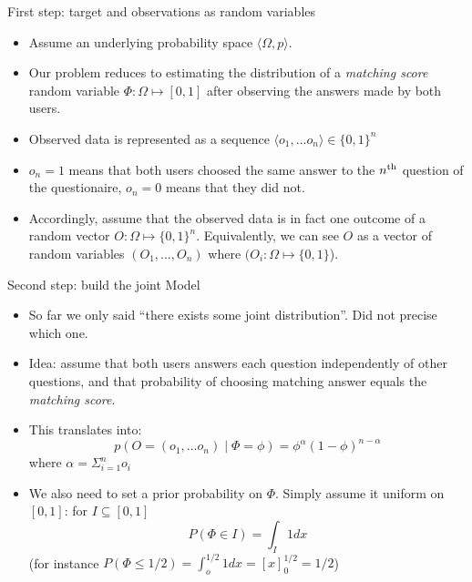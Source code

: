 \documentclass{beamer}
\begin{document}
\begin{frame}{First step: target and observations as random variables}
  \begin{itemize}
  \item Assume an underlying probability space $\langle \Omega, p \rangle$.
  \item Our problem reduces to estimating the distribution of a \emph{matching score} random variable $\Phi: \Omega \mapsto [0, 1]$ after observing the answers made by both users.
  \item Observed data is represented as a sequence $\langle o_1, \dots o_n \rangle \in \{0,1\}^n$
  \item $o_n = 1$ means that both users choosed the same answer to the $n^\textnormal{th}$ question of the questionaire, $o_n = 0$ means that they did not.
  \item Accordingly, assume that the observed data is in fact one outcome of a random vector $O: \Omega \mapsto \{0, 1\}^n$. Equivalently, we can see $O$ as a vector of random variables $(O_1, \dots, O_n)$ where  $(O_i: \Omega \mapsto \{0,1\}$).
  \end{itemize}
    
\end{frame}

\begin{frame}{Second step: build the joint Model}
  \begin{itemize}
  \item So far we only said ``there exists some joint distribution''. Did not precise which one.
  \item Idea: assume that both users answers each question independently of other questions, and that probability of choosing matching answer equals the \emph{matching score}.
  \item This translates into: \[ p(O = (o_1, \dots o_n) \mid \Phi = \phi) = \phi^\alpha (1-\phi)^{n-\alpha} \] where $\alpha = \Sigma_{i=1}^n o_i$
  \item We also need to set a prior probability on $\Phi$. Simply assume it uniform on $[0,1]$: for $I \subseteq [0,1]$ \[P(\Phi \in I) = \int_I 1 dx\]
    (for instance $P(\Phi \le 1/2) = \int_o^{1/2} 1 dx =  [x]^{1/2}_{0} = 1/2$)
  \end{itemize}
\end{frame}
\end{document}
